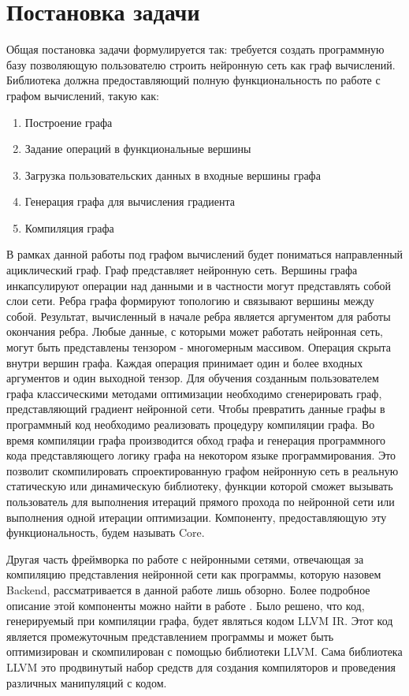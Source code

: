 \clearpage
\section{Постановка задачи}
Общая постановка задачи формулируется так: требуется создать программную базу позволяющую пользователю строить нейронную сеть как граф вычислений. Библиотека должна предоставляющий полную функциональность по работе с графом вычислений, такую как:
\begin{enumerate}
    \item Построение графа
    \item Задание операций в функциональные вершины
    \item Загрузка пользовательских данных в входные вершины графа
    \item Генерация графа для вычисления градиента
    \item Компиляция графа
\end{enumerate}
\par
В рамках данной работы под графом вычислений будет пониматься направленный ациклический граф. Граф представляет нейронную сеть. Вершины графа инкапсулируют операции над данными и в частности могут представлять собой слои сети. Ребра графа формируют топологию и связывают вершины между собой. Результат, вычисленный в начале ребра является аргументом для работы окончания ребра. Любые данные, с которыми может работать нейронная сеть, могут быть представлены тензором - многомерным массивом. Операция скрыта внутри вершин графа. Каждая операция принимает один и более входных аргументов и один выходной тензор. Для обучения созданным пользователем графа классическими методами оптимизации необходимо сгенерировать граф, представляющий градиент нейронной сети. Чтобы превратить данные графы в программный код необходимо реализовать процедуру компиляции графа. Во время компиляции графа производится обход графа и генерация программного кода представляющего логику графа на некотором языке программирования. Это позволит скомпилировать спроектированную графом нейронную сеть в реальную статическую или динамическую библиотеку, функции которой сможет вызывать пользователь для выполнения итераций прямого прохода по нейронной сети или выполнения одной итерации оптимизации. Компоненту, предоставляющую эту функциональность, будем называть Core.
\par
Другая часть фреймворка по работе с нейронными сетями, отвечающая за компиляцию представления нейронной сети как программы, которую назовем Backend, рассматривается в данной работе лишь обзорно. Более подробное описание этой компоненты можно найти в работе \cite{coauthor}. Было решено, что код, генерируемый при компиляции графа, будет являться кодом LLVM IR. Этот код является промежуточным представлением программы и может быть оптимизирован и скомпилирован с помощью библиотеки LLVM. Сама библиотека LLVM это продвинутый набор средств для создания компиляторов и проведения различных манипуляций с кодом.
